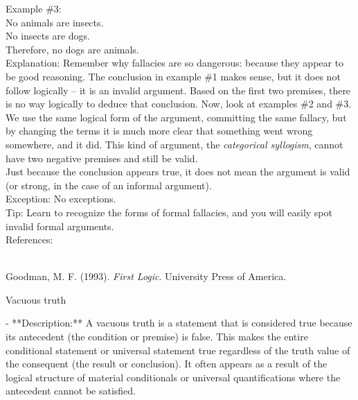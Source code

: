 \documentclass[a4paper,12pt,single,pdftex]{scrartcl}
\begin{document}
    
      Example \#3:
    \\

    
      No animals are insects.
    \\

    
      No insects are dogs.
    \\

    
      Therefore, no dogs are animals.
    \\

    
      Explanation: Remember why fallacies are so dangerous: because they appear to be good reasoning.  The conclusion in example \#1 makes sense, but it does not follow logically -- it is an invalid argument.  Based on the first two premises, there is no way logically to deduce that conclusion.  Now, look at examples \#2 and \#3.  We use the same logical form of the argument, committing the same fallacy, but by changing the terms it is much more clear that something went wrong somewhere, and it did.  This kind of argument, the {\it categorical syllogism}, cannot have two negative premises and still be valid.
    \\

    
      Just because the conclusion appears true, it does not mean the argument is valid (or strong, in the case of an informal argument).
    \\

    
      Exception: No exceptions.
    \\

    
      Tip: Learn to recognize the forms of formal fallacies, and you will easily spot invalid formal arguments.
    \\

    References:

    
      
        
      \\

      
        
          Goodman, M. F. (1993). {\it First Logic}. University Press of America.
        
      
    
  

Vacuous truth
    
      - **Description:** A vacuous truth is a statement that is considered true because its antecedent (the condition or premise) is false. This makes the entire conditional statement or universal statement true regardless of the truth value of the consequent (the result or conclusion). It often appears as a result of the logical structure of material conditionals or universal quantifications where the antecedent cannot be satisfied.
    \\
\end{document}

